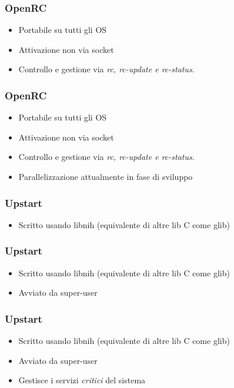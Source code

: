 \documentclass{beamer}
\begin{document}

\begin{frame}
	\frametitle{OpenRC}
	\begin{itemize}
		\item Portabile su tutti gli OS
		\item Attivazione non via socket
		\item Controllo e gestione via \textit{rc, rc-update e rc-status}. 
	\end{itemize}	 
\end{frame}


\begin{frame}
	\frametitle{OpenRC}
	\begin{itemize}
		\item Portabile su tutti gli OS
		\item Attivazione non via socket
		\item Controllo e gestione via \textit{rc, rc-update e rc-status}. 
		\item Parallelizzazione attualmente in fase di sviluppo
	\end{itemize}	 
\end{frame}


\begin{frame}
	\frametitle{Upstart}
	\begin{itemize}
		\item Scritto usando libnih (equivalente di altre lib C come glib)
	\end{itemize}
\end{frame}


\begin{frame}
	\frametitle{Upstart}
	\begin{itemize}
		\item Scritto usando libnih (equivalente di altre lib C come glib)
		\item Avviato da super-user
	\end{itemize}
\end{frame}


\begin{frame}
	\frametitle{Upstart}
	\begin{itemize}
		\item Scritto usando libnih (equivalente di altre lib C come glib)
		\item Avviato da super-user
		\item Gestisce i servizi \textit{critici} del sistema
	\end{itemize}
\end{frame}
\end{document}
